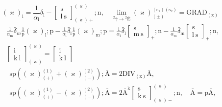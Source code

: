 \documentclass[12pt]{article}
\begin{document}
\begin{itemize}
    \begin{equation}
    (\varkappa)_\mathrm{l} = \frac{1}{\alpha_\mathrm{l}} \bar{\delta}_\mathrm{l} - \left[ \begin{matrix} \mathrm{s} \\ \mathrm{l\ s} \end{matrix} \right]^{(\varkappa)}_{(\varkappa)+} ; \mathrm{n}, \quad \lim_{{}^2\bar{\gamma} \to {}^2\bar{\mathrm{E}}} (\varkappa)^{(\mathrm{s_1})(\mathrm{s_2})}_{(\pm)} = \mathrm{GRAD}_{(\mathrm{x})} \tag{96b}
    \end{equation}
    \begin{equation}
    \begin{aligned}
    & \frac{1}{\alpha_\mathrm{m}} \bar{\delta}_m \frac{1}{\mathrm{p}} (\varkappa)_\mathrm{l} ; \mathrm{p} - \frac{1}{\alpha_\mathrm{l}} \bar{\delta}_\mathrm{l} \frac{1}{\mathrm{p}} (\varkappa)_\mathrm{m} ; \mathrm{p} = \frac{1}{\alpha_\mathrm{l}} \bar{\delta}_\mathrm{l} \left[ \begin{matrix} \mathrm{s} \\ \mathrm{m\ s} \end{matrix} \right]_+ ; \mathrm{n} - \frac{1}{\alpha_\mathrm{m}} \bar{\delta}_\mathrm{m} \left[ \begin{matrix} \mathrm{s} \\ \mathrm{l\ s} \end{matrix} \right]_+ ; \mathrm{n}, \\
    & \left[ \begin{matrix} \mathrm{i} \\ \mathrm{k\ l} \end{matrix} \right]^{(\varkappa)}_{(\varkappa)} = \left[ \begin{matrix} \mathrm{i} \\ \mathrm{k\ l} \end{matrix} \right]
    \end{aligned} \tag{97}
    \end{equation}
    \begin{equation}
    \begin{aligned}
    & \mathrm{sp}\left( (\varkappa)^{(1)}_{(+)} + (\varkappa)^{(2)}_{(-)} \right) ; \bar{\mathrm{A}} = 2\mathrm{DIV}_{(\mathrm{x})} \bar{\mathrm{A}}, \\
    & \mathrm{sp}\left( (\varkappa)^{(1)}_{(+)} - (\varkappa)^{(2)}_{(-)} \right) ; \bar{\mathrm{A}} = 2\bar{\mathrm{A}}^\mathrm{k} \left[ \begin{matrix} \mathrm{s} \\ \mathrm{k\ s} \end{matrix} \right]^{(\varkappa)}_{(\varkappa)-} ; \mathrm{n}, \quad \bar{\mathrm{A}} = \mathrm{p} \bar{\mathrm{A}}, \\

\end{aligned}
\end{equation}
\end{itemize}
\end{document}
